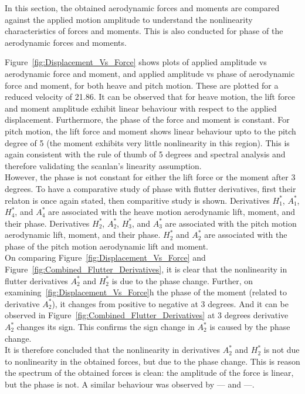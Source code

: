 \documentclass[a4paper, 12pt]{report}
\begin{document}
In this section, the obtained aerodynamic forces and moments are compared against the applied motion 
amplitude to understand the nonlinearity characteristics of forces and moments. This is also 
conducted for phase of the aerodynamic forces and moments.

Figure~\ref{fig:Displacement_Vs_Force} shows plots of applied amplitude vs aerodynamic force and moment, and 
applied amplitude vs phase of aerodynamic force and moment, for both heave and pitch motion. These are plotted for 
a reduced velocity of 21.86. It can be observed that for heave motion, the lift force and moment amplitude 
exhibit linear behaviour with respect to the applied displacement. Furthermore, the phase of the force and 
moment is constant. For pitch motion, the lift force and moment shows linear behaviour upto to the pitch degree of 5
(the moment exhibits very little nonlinearity in this region). This is again consistent with the rule of thumb of 5 degrees and 
spectral analysis and therefore validating the scanlan's linearity assumption. \\

However, the phase is not constant for either the lift force or the moment after 3 degrees. To have a 
comparative study of phase with flutter derivatives, first their relaton is once again stated, then comparitive study is shown. 
Derivatives $H_1^*$, $A_1^*$, $H_4^*$, and $A_4^*$ are associated with the heave motion aerodynamic 
lift, moment, and their phase. Derivatives $H_2^*$, $A_2^*$, $H_3^*$, and $A_3^*$ are associated with the pitch motion aerodynamic 
lift, moment, and their phase. $H_2^*$ and $A_2^*$ are associated with the phase of the pitch motion aerodynamic 
lift and moment. \\

On comparing Figure~\ref{fig:Displacement_Vs_Force} and Figure~\ref{fig:Combined_Flutter_Derivatives}, 
it is clear that the nonlinearity in flutter derivatives $A_2^*$ and $H_2^*$ is due to the phase change.
Further, on examining~\ref{fig:Displacement_Vs_Force}{h} the phase of the moment (related to derivative $A_2^*$), it changes 
from positive to negative at 3 degrees. And it can be observed in Figure~\ref{fig:Combined_Flutter_Derivatives} 
at 3 degrees derivative $A_2^*$ changes its sign. This confirms the sign change in $A_2^*$ is caused by the phase change. \\

It is therefore concluded that the nonlinearity in derivatives $A_2^*$ and $H_2^*$ is not due to nonlinearity in the obtained forces, 
but due to the phase change.
This is reason the spectrum of the obtained forces is clean: the amplitude of the force is linear, but the phase is not.
A similar behaviour was observed by --- and ---. \\
\end{document}
